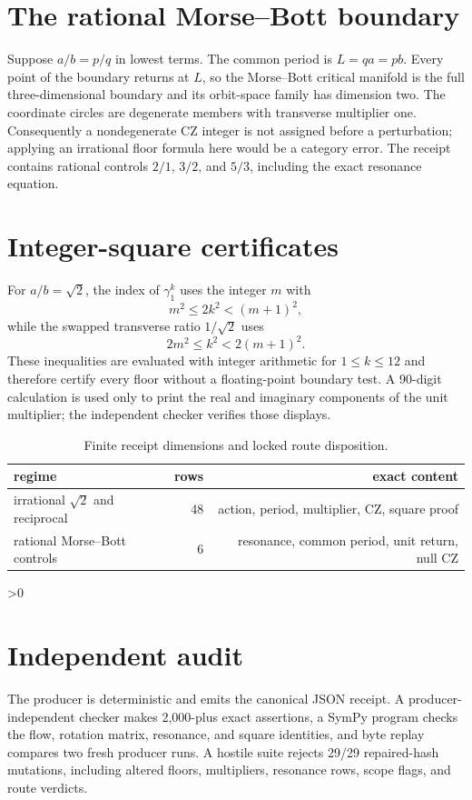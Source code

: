 \documentclass[10pt]{article}
\begin{document}
\section{The rational Morse--Bott boundary}
Suppose \(a/b=p/q\) in lowest terms.  The common period is
\(L=qa=pb\).  Every point of the boundary returns at \(L\), so the
Morse--Bott critical manifold is the full three-dimensional boundary and its
orbit-space family has dimension two.  The coordinate circles are degenerate
members with transverse multiplier one.  Consequently a nondegenerate CZ
integer is not assigned before a perturbation; applying an irrational floor
formula here would be a category error.  The receipt contains rational
controls \(2/1\), \(3/2\), and \(5/3\), including the exact resonance equation.

\section{Integer-square certificates}
For \(a/b=\sqrt2\), the index of \(\gamma_1^k\) uses the integer \(m\) with
\[
 m^2\le2k^2<(m+1)^2,
\]
while the swapped transverse ratio \(1/\sqrt2\) uses
\[
 2m^2\le k^2<2(m+1)^2.
\]
These inequalities are evaluated with integer arithmetic for \(1\le k\le12\)
and therefore certify every floor without a floating-point boundary test.  A
90-digit calculation is used only to print the real and imaginary components
of the unit multiplier; the independent checker verifies those displays.

\begin{table}[h]
\centering
\caption{Finite receipt dimensions and locked route disposition.}
\begin{tabular}{lrr}
\toprule
regime & rows & exact content\\
\midrule
irrational \(\sqrt2\) and reciprocal & 48 & action, period, multiplier, CZ, square proof\\
rational Morse--Bott controls & 6 & resonance, common period, unit return, null CZ\\
\bottomrule
\end{tabular}
\end{table}

\ifnum\CRevisionRound>0
\section{Independent audit}
The producer is deterministic and emits the canonical JSON receipt.  A
producer-independent checker makes 2,000-plus exact assertions, a SymPy
program checks the flow, rotation matrix, resonance, and square identities,
and byte replay compares two fresh producer runs.  A hostile suite rejects
29/29 repaired-hash mutations, including altered floors, multipliers,
resonance rows, scope flags, and route verdicts.
\fi
\end{document}
